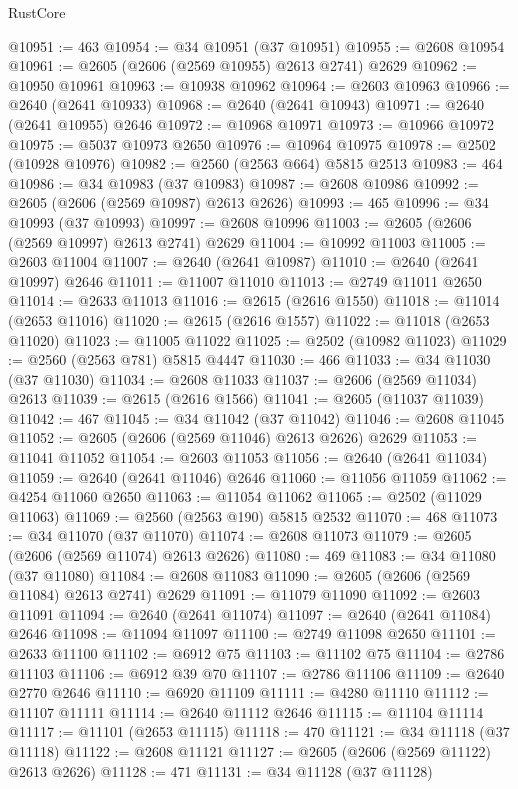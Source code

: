 \begin{lexlean}{RustCore}
\begin{coremodule}
@10951 := 463
@10954 := @34 @10951 (@37 @10951)
@10955 := @2608 @10954
@10961 := @2605 (@2606 (@2569 @10955) @2613 @2741) @2629
@10962 := @10950 @10961
@10963 := @10938 @10962
@10964 := @2603 @10963
@10966 := @2640 (@2641 @10933)
@10968 := @2640 (@2641 @10943)
@10971 := @2640 (@2641 @10955) @2646
@10972 := @10968 @10971
@10973 := @10966 @10972
@10975 := @5037 @10973 @2650
@10976 := @10964 @10975
@10978 := @2502 (@10928 @10976)
@10982 := @2560 (@2563 @664) @5815 @2513
@10983 := 464
@10986 := @34 @10983 (@37 @10983)
@10987 := @2608 @10986
@10992 := @2605 (@2606 (@2569 @10987) @2613 @2626)
@10993 := 465
@10996 := @34 @10993 (@37 @10993)
@10997 := @2608 @10996
@11003 := @2605 (@2606 (@2569 @10997) @2613 @2741) @2629
@11004 := @10992 @11003
@11005 := @2603 @11004
@11007 := @2640 (@2641 @10987)
@11010 := @2640 (@2641 @10997) @2646
@11011 := @11007 @11010
@11013 := @2749 @11011 @2650
@11014 := @2633 @11013
@11016 := @2615 (@2616 @1550)
@11018 := @11014 (@2653 @11016)
@11020 := @2615 (@2616 @1557)
@11022 := @11018 (@2653 @11020)
@11023 := @11005 @11022
@11025 := @2502 (@10982 @11023)
@11029 := @2560 (@2563 @781) @5815 @4447
@11030 := 466
@11033 := @34 @11030 (@37 @11030)
@11034 := @2608 @11033
@11037 := @2606 (@2569 @11034) @2613
@11039 := @2615 (@2616 @1566)
@11041 := @2605 (@11037 @11039)
@11042 := 467
@11045 := @34 @11042 (@37 @11042)
@11046 := @2608 @11045
@11052 := @2605 (@2606 (@2569 @11046) @2613 @2626) @2629
@11053 := @11041 @11052
@11054 := @2603 @11053
@11056 := @2640 (@2641 @11034)
@11059 := @2640 (@2641 @11046) @2646
@11060 := @11056 @11059
@11062 := @4254 @11060 @2650
@11063 := @11054 @11062
@11065 := @2502 (@11029 @11063)
@11069 := @2560 (@2563 @190) @5815 @2532
@11070 := 468
@11073 := @34 @11070 (@37 @11070)
@11074 := @2608 @11073
@11079 := @2605 (@2606 (@2569 @11074) @2613 @2626)
@11080 := 469
@11083 := @34 @11080 (@37 @11080)
@11084 := @2608 @11083
@11090 := @2605 (@2606 (@2569 @11084) @2613 @2741) @2629
@11091 := @11079 @11090
@11092 := @2603 @11091
@11094 := @2640 (@2641 @11074)
@11097 := @2640 (@2641 @11084) @2646
@11098 := @11094 @11097
@11100 := @2749 @11098 @2650
@11101 := @2633 @11100
@11102 := @6912 @75
@11103 := @11102 @75
@11104 := @2786 @11103
@11106 := @6912 @39 @70
@11107 := @2786 @11106
@11109 := @2640 @2770 @2646
@11110 := @6920 @11109
@11111 := @4280 @11110
@11112 := @11107 @11111
@11114 := @2640 @11112 @2646
@11115 := @11104 @11114
@11117 := @11101 (@2653 @11115)
@11118 := 470
@11121 := @34 @11118 (@37 @11118)
@11122 := @2608 @11121
@11127 := @2605 (@2606 (@2569 @11122) @2613 @2626)
@11128 := 471
@11131 := @34 @11128 (@37 @11128)

\end{coremodule}
\end{lexlean}
